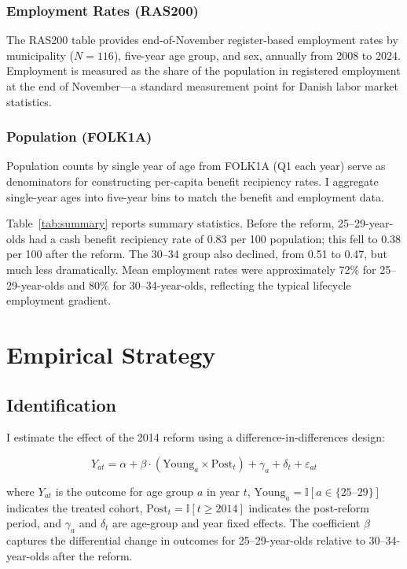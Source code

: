 \documentclass[12pt]{article}
\newcommand{\ind}{\mathbb{I}}
\begin{document}
\subsubsection*{Employment Rates (RAS200)} The RAS200 table provides end-of-November register-based employment rates by municipality ($N=116$), five-year age group, and sex, annually from 2008 to 2024. Employment is measured as the share of the population in registered employment at the end of November---a standard measurement point for Danish labor market statistics.

\subsubsection*{Population (FOLK1A)} Population counts by single year of age from FOLK1A (Q1 each year) serve as denominators for constructing per-capita benefit recipiency rates. I aggregate single-year ages into five-year bins to match the benefit and employment data.



Table~\ref{tab:summary} reports summary statistics. Before the reform, 25--29-year-olds had a cash benefit recipiency rate of 0.83 per 100 population; this fell to 0.38 per 100 after the reform. The 30--34 group also declined, from 0.51 to 0.47, but much less dramatically. Mean employment rates were approximately 72\% for 25--29-year-olds and 80\% for 30--34-year-olds, reflecting the typical lifecycle employment gradient.

\section{Empirical Strategy}

\subsection{Identification}

I estimate the effect of the 2014 reform using a difference-in-differences design:

\begin{equation}
Y_{at} = \alpha + \beta \cdot (\text{Young}_a \times \text{Post}_t) + \gamma_a + \delta_t + \varepsilon_{at}
\label{eq:did}
\end{equation}

\noindent where $Y_{at}$ is the outcome for age group $a$ in year $t$, $\text{Young}_a = \ind[a \in \{25\text{--}29\}]$ indicates the treated cohort, $\text{Post}_t = \ind[t \geq 2014]$ indicates the post-reform period, and $\gamma_a$ and $\delta_t$ are age-group and year fixed effects. The coefficient $\beta$ captures the differential change in outcomes for 25--29-year-olds relative to 30--34-year-olds after the reform.
\end{document}
